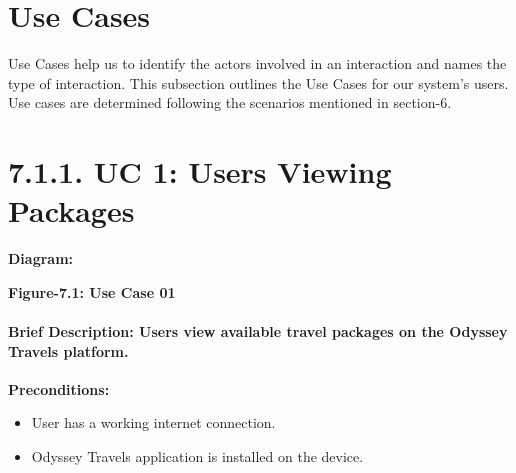 \documentclass{scrreprt}
\begin{document}
\section{Use Cases}
Use Cases help us to identify the actors involved in an interaction and names the type of interaction.
This subsection outlines the Use Cases for our system’s users. Use cases are determined following
the scenarios mentioned in section-6.

\section*{\textbf{7.1.1. UC 1: Users Viewing Packages}}
\textbf{Diagram:}
\newline
\newline
\begin{center}
    \parbox{0.8\textwidth}{ 
        \centering
    }
\end{center}

\begin{center}
    \parbox{0.8\textwidth}{ 
        \centering
        \textbf{Figure-7.1: Use Case 01}
    }
\end{center}

\paragraph {\textnormal{Brief Description: 
Users view available travel packages on the Odyssey Travels platform.}}

\textbf{Preconditions:}
\begin{itemize}
    \item User has a working internet connection.
    \item Odyssey Travels application is installed on the device.
\end{itemize}
\end{document}
